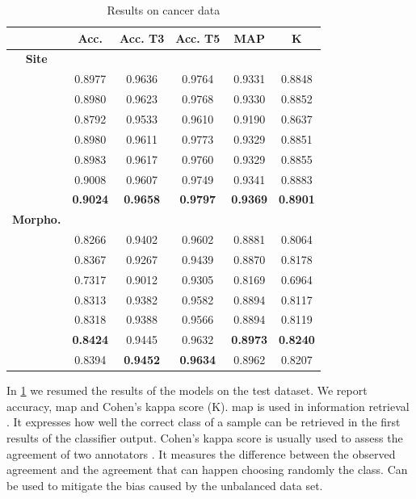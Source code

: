 \begin{table}
  \centering
  \caption{Results on cancer data}
  \label{tab:results}
  \begin{tabular}{|c|c|c|c|c|c|}
    \hline
    &Acc.&Acc. T3&Acc. T5&MAP&K\\
    \hline
    \hline
    \textbf{Site}&&&&&\\
    \gru{}&0.8977&0.9636&0.9764&0.9331&0.8848\\
    \bert{}&0.8980&0.9623&0.9768&0.9330&0.8852\\
    \maxi{}&0.8792&0.9533&0.9610&0.9190&0.8637\\
    \maxh{}&0.8980&0.9611&0.9773&0.9329&0.8851\\
    \softmaxh{}&0.8983&0.9617&0.9760&0.9329&0.8855\\
    \softmax{}&0.9008&0.9607&0.9749&0.9341&0.8883\\
    \maxp{}&\textbf{0.9024}&\textbf{0.9658}&\textbf{0.9797}&\textbf{0.9369}&\textbf{0.8901}\\
    \hline
    \hline
    \textbf{Morpho.}&&&&&\\
    \gru{}&0.8266&0.9402&0.9602&0.8881&0.8064\\
    \bert{}&0.8367&0.9267&0.9439&0.8870&0.8178\\
    \maxi{}&0.7317&0.9012&0.9305&0.8169&0.6964\\
    \maxh{}&0.8313&0.9382&0.9582&0.8894&0.8117\\
    \softmaxh{}&0.8318&0.9388&0.9566&0.8894&0.8119\\
    \softmax{}&\textbf{0.8424}&0.9445&0.9632&\textbf{0.8973}&\textbf{0.8240}\\
    \maxp{}&0.8394&\textbf{0.9452}&\textbf{0.9634}&0.8962&0.8207\\
    \hline
  \end{tabular}
\end{table}
In \cref{tab:results} we resumed the results of the models on the test
dataset. We report accuracy, \ac{map} and Cohen's kappa score (K).
\ac{map} is used in information
retrieval \cite{manning_introduction_2008}. It expresses how well the
correct class of a sample can be retrieved in 
the first results of the classifier output.
Cohen's kappa score is usually used to assess
the agreement of two annotators \cite{cohen_coefficient_1960}. It
measures the difference between the observed agreement and the
agreement that can happen choosing randomly the class. Can be used to
mitigate the bias caused by the unbalanced data set.


